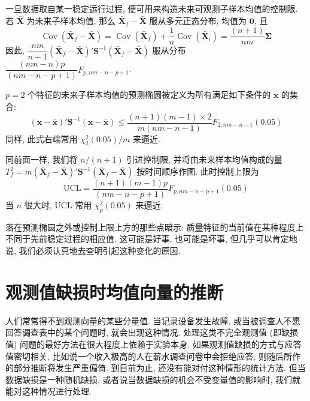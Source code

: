 
一旦数据取自某一稳定运行过程, 便可用来构造未来可观测子样本均值的控制限. 若 $\bar{\mathbf{X}}$ 为未来子样本均值, 那么 $\bar{\mathbf{X}}_{f}-\bar{\mathbf{X}}$ 服从多元正态分布, 均值为 $\mathbf{0}$, 且
\[
\operatorname{Cov}(\bar{\mathbf{X}}_{f}-\bar{\mathbf{X}})=\operatorname{Cov}(\bar{\mathbf{X}}_{f})+\frac{1}{n}\operatorname{Cov}(\bar{\mathbf{X}}_{i})=\frac{(n+1)}{nm}\boldsymbol{\Sigma}
\]
因此, $\dfrac{nm}{n+1}(\bar{\mathbf{X}}_{f}-\bar{\mathbf{X}})'\mathbf{S}^{-1}(\bar{\mathbf{X}}_{f}-\bar{\mathbf{X}})$ 服从分布 $\dfrac{(nm-n)p}{(nm-n-p+1)}F_{p,nm-n-p+1}$.

\medskip
\noindent{}\quad $p=2$ 个特征的未来子样本均值的预测椭圆被定义为所有满足如下条件的 $\mathbf{x}$ 的集合:
\label{eq:5-37}
\begin{equation}
(\mathbf{x}-\bar{\mathbf{x}})'\mathbf{S}^{-1}(\mathbf{x}-\bar{\mathbf{x}})\le\frac{(n+1)(m-1)\times2}{m(nm-n-1)}F_{2,nm-n-1}(0.05)
\tag{5-37}
\end{equation}
同样, 此式右端常用 $\chi_{2}^{2}(0.05)/m$ 来逼近.

\medskip
\noindent{}\quad 同前面一样, 我们将 $n/(n+1)$ 引进控制限, 并将由未来样本均值构成的量 $T_{f}^{2}=m(\bar{\mathbf{X}}_{f}-\bar{\mathbf{X}})'\mathbf{S}^{-1}(\bar{\mathbf{X}}_{f}-\bar{\mathbf{X}})$ 按时间顺序作图. 此时控制上限为
\[
\text{UCL}=\frac{(n+1)(m-1)p}{(nm-n-p+1)}F_{p,nm-n-p+1}(0.05)
\]
当 $n$ 很大时, UCL 常用 $\chi_{p}^{2}(0.05)$ 来逼近.

落在预测椭圆之外或控制上限上方的那些点暗示: 质量特征的当前值在某种程度上不同于先前稳定过程的相应值. 这可能是好事, 也可能是坏事, 但几乎可以肯定地说, 我们必须认真地去查明引起这种变化的原因.

\section{观测值缺损时均值向量的推断}
\label{sec:5.7}

人们常常得不到观测向量的某些分量值. 当记录设备发生故障, 或当被调查人不愿回答调查表中的某个问题时, 就会出现这种情况. 处理这类不完全观测值 (即缺损值) 问题的最好方法在很大程度上依赖于实验本身. 如果观测值缺损的方式与应答值密切相关, 比如说一个收入极高的人在薪水调查问卷中会拒绝应答, 则随后所作的部分推断将发生严重偏倚. 到目前为止, 还没有能对付这种情形的统计方法. 但当数据缺损是一种随机缺损, 或者说当数据缺损的机会不受变量值的影响时, 我们就能对这种情况进行处理.

